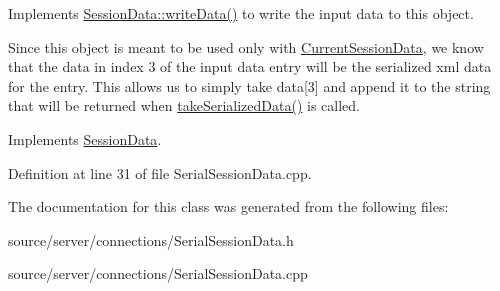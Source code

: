 Implements \hyperlink{class_session_data_ad05a594d8410d638f1a066bfa5a10ba3}{Session\-Data\-::write\-Data()} to write the input data to this object. 

Since this object is meant to be used only with \hyperlink{class_current_session_data}{Current\-Session\-Data}, we know that the data in index 3 of the input data entry will be the serialized xml data for the entry. This allows us to simply take data\mbox{[}3\mbox{]} and append it to the string that will be returned when \hyperlink{class_serial_session_data_adbd0b301805d06377ae635839419698f}{take\-Serialized\-Data()} is called. 

Implements \hyperlink{class_session_data_ad05a594d8410d638f1a066bfa5a10ba3}{Session\-Data}.



Definition at line 31 of file Serial\-Session\-Data.\-cpp.



The documentation for this class was generated from the following files\-:\begin{DoxyCompactItemize}
\item 
source/server/connections/Serial\-Session\-Data.\-h\item 
source/server/connections/Serial\-Session\-Data.\-cpp\end{DoxyCompactItemize}
